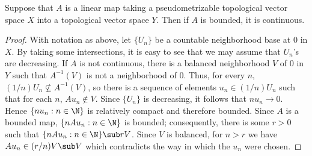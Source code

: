 \begin{proposition}\label{TVS pseudometrizable linear map continuous iff bounded}
Suppose that $A$ is a linear map taking a pseudometrizable topological vector space $X$ into a topological vector space $Y$. Then if $A$ is bounded, it is continuous.
\end{proposition}
\begin{proof}
With notation as above, let $\{U_n\}$ be a countable neighborhood base at $0$ in $X$. By taking some intersections, it is easy to see that we may assume that $U_n$'s are decreasing. If $A$ is not continuous, there is a balanced neighborhood $V$ of $0$ in $Y$ such that $A^{-1}(V)$ is not a neighborhood of $0$. Thus, for every $n$, $(1/n)U_n\nsubseteq A^{-1}(V)$, so there is a sequence of elements $u_n\in (1/n)U_n$ such that for each $n$, $Au_n\notin V$. Since $\{U_n\}$ is decreasing, it follows that $nu_n\to 0$. Hence $\{nu_n:n\in\N\}$ is relatively compact and therefore bounded. Since $A$ is a bounded map, $\{nAu_n:n\in\N\}$ is bounded; consequently, there is some $r>0$ such that $\{nAu_n:n\in\N\}\sub rV$. Since $V$ is balanced, for $n>r$ we have $Au_n\in(r/n)V\sub V$ which contradicts the way in which the $u_n$ were chosen.
\end{proof}
